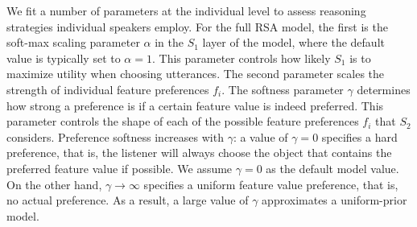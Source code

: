 \documentclass[10pt,a4paper]{article}
\newcommand{\gcs}[1]{\textcolor{blue}{[gcs: #1]}}
\begin{document}
We fit a number of parameters at the individual level to assess reasoning strategies individual speakers employ.
For the full RSA model, the first is the soft-max scaling parameter $\alpha$ in the $S_1$ layer of the model, where the default value is typically set to $\alpha=1$. 
This parameter controls how likely $S_1$ is to maximize utility when choosing utterances. The second parameter scales the strength of individual feature preferences $f_i$. 
The softness parameter $\gamma$ determines how strong a preference is if a certain feature value is indeed preferred.
This parameter controls the shape of each of the possible feature preferences $f_i$ that $S_2$ considers. 
Preference softness increases with $\gamma$: 
a value of $\gamma=0$ specifies a hard preference, that is, the listener will always choose the object that contains the preferred feature value if possible. 
We assume $\gamma=0$ as the default model value. 
On the other hand, $\gamma \rightarrow \infty$ specifies a uniform feature value preference, that is, no actual preference.
As a result, a large value of $\gamma$ approximates a uniform-prior model. %

\end{document}
